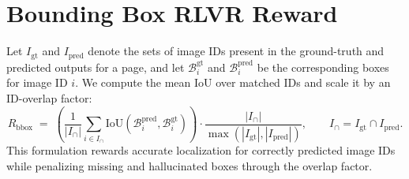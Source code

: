 \documentclass{article}
\begin{document}
\section{Bounding Box RLVR Reward}
\label{app:bbox_reward}
Let $I_{\text{gt}}$ and $I_{\text{pred}}$ denote the sets of image IDs present in the ground-truth and predicted outputs for a page, and let $\mathcal{B}^{\text{gt}}_i$ and $\mathcal{B}^{\text{pred}}_i$ be the corresponding boxes for image ID $i$. We compute the mean IoU over matched IDs and scale it by an ID-overlap factor:
\begin{equation}
R_{\text{bbox}} \;=\;
\left(\frac{1}{|I_{\cap}|}\sum_{i \in I_{\cap}} \mathrm{IoU}\!\left(\mathcal{B}^{\text{pred}}_i, \mathcal{B}^{\text{gt}}_i\right)\right)
\cdot
\frac{|I_{\cap}|}{\max\!\left(|I_{\text{gt}}|, |I_{\text{pred}}|\right)},
\qquad
I_{\cap}= I_{\text{gt}} \cap I_{\text{pred}} .
\end{equation}
This formulation rewards accurate localization for correctly predicted image IDs while penalizing missing and hallucinated boxes through the overlap factor.


\end{document}
